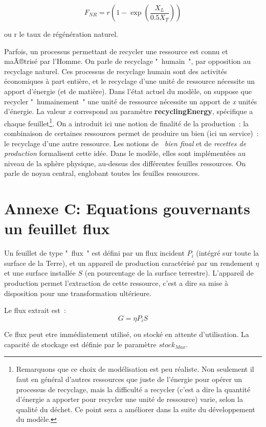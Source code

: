 \documentclass[12pt,a4paper]{article}%
\begin{document}
\[
F_{NR}=r\left(  1-\exp\left(  \frac{X_{L}}{0.5X_{T}}\right)  \right)
\]


ou r le taux de régénération naturel.

Parfois, un processus permettant de recycler une ressource est connu et
maÃ®trisé par l'Homme. On parle de recyclage "~humain~", par opposition au
recyclage naturel. Ces processus de recyclage humain sont des activités
économiques à part entière, et le recyclage d'une unité de ressource
nécessite un apport d'énergie (et de matière). Dans l'état actuel du
modèle, on suppose que recycler "~humainement~" une unité de ressource
nécessite un apport de \textit{x} unités d'énergie. La valeur \textit{x
}correspond au paramètre \textbf{recyclingEnergy}, spécifique a chaque
feuillet\footnote{Remarquons que ce choix de modélisation est peu réaliste.
Non seulement il faut en général d'autres ressources que juste de l'énergie
pour opérer un processus de recyclage, mais la difficulté a recycler (c'est a
dire la quantité d'énergie a apporter pour recycler une unité de ressource)
varie, selon la qualité du déchet. Ce point sera a améliorer dans la suite du
développement du modèle.}. On a introduit ici une notion de finalité de la
production~: la combinaison de certaines ressources permet de produire un bien
(ici un service)~: le recyclage d'une autre ressource. Les notions de
\textit{\ bien final} et de \textit{recettes de production} formalisent cette
idée. Dans le modèle, elles sont implémentées au niveau de la sphère
physique, au-dessus des différentes feuilles ressources. On parle de noyau
central, englobant toutes les feuilles ressources.

\section{Annexe C: Equations gouvernants un feuillet flux}

Un feuillet de type "~flux~" est défini par un flux incident $P_{i}$ (intégré
sur toute la surface de la Terre), et un appareil de production caractérisé
par un rendement $\eta$ et une surface installée $S$ (en pourcentage de la
surface terrestre). L'appareil de production permet l'extraction de cette
ressource, c'est a dire sa mise à disposition pour une transformation ultérieure.

Le flux extrait est~:$\ \ \ \ \ \ \ \ \ \ \ \ \ \ \ \ \ \ \ \ $%
\[
G=\eta P_{i}S
\]


Ce flux peut etre immédiatement utilisé, ou stocké en attente d'utilisation.
La capacité de stockage est définie par le paramètre $stock_{Max}$.
\end{document}
